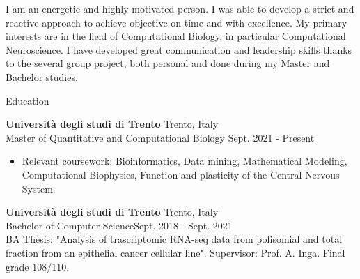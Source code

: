\documentclass{resume} %
\begin{document}
\begin{rSection}{}
I am an energetic and highly motivated person.
I was able to develop a strict and reactive approach to achieve objective on time and with excellence.
My primary interests are in the field of Computational Biology, in particular Computational Neuroscience.
I have developed great communication and leadership skills thanks to the several group project, both personal and done during my Master and Bachelor studies.
\end{rSection}





\begin{rSection}{Education}

{\bf Universit\`a degli studi di Trento} \hfill {Trento, Italy}\\
Master of Quantitative and Computational Biology \hfill {Sept. 2021 - Present}
\begin{itemize}
   \item Relevant coursework: Bioinformatics, Data mining, Mathematical Modeling, Computational Biophysics, Function and plasticity of the Central Nervous System.
\end{itemize}

{\bf Universit\`a degli studi di Trento} \hfill {Trento, Italy}\\
Bachelor of Computer Science\hfill {Sept. 2018 - Sept. 2021}\\
BA Thesis: "Analysis of trascriptomic RNA-seq data from polisomial and total fraction from an epithelial cancer cellular line". Supervisor: Prof. A. Inga. Final grade 108/110.


\end{rSection}
\end{document}
